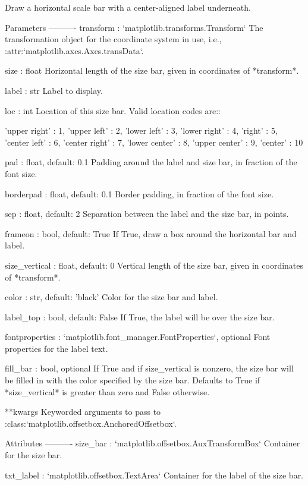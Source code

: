 \begin{DoxyVerb}Draw a horizontal scale bar with a center-aligned label underneath.

Parameters
----------
transform : `matplotlib.transforms.Transform`
    The transformation object for the coordinate system in use, i.e.,
    :attr:`matplotlib.axes.Axes.transData`.

size : float
    Horizontal length of the size bar, given in coordinates of
    *transform*.

label : str
    Label to display.

loc : int
    Location of this size bar. Valid location codes are::

'upper right'  : 1,
'upper left'   : 2,
'lower left'   : 3,
'lower right'  : 4,
'right'        : 5,
'center left'  : 6,
'center right' : 7,
'lower center' : 8,
'upper center' : 9,
'center'       : 10

pad : float, default: 0.1
    Padding around the label and size bar, in fraction of the font
    size.

borderpad : float, default: 0.1
    Border padding, in fraction of the font size.

sep : float, default: 2
    Separation between the label and the size bar, in points.

frameon : bool, default: True
    If True, draw a box around the horizontal bar and label.

size_vertical : float, default: 0
    Vertical length of the size bar, given in coordinates of
    *transform*.

color : str, default: 'black'
    Color for the size bar and label.

label_top : bool, default: False
    If True, the label will be over the size bar.

fontproperties : `matplotlib.font_manager.FontProperties`, optional
    Font properties for the label text.

fill_bar : bool, optional
    If True and if size_vertical is nonzero, the size bar will
    be filled in with the color specified by the size bar.
    Defaults to True if *size_vertical* is greater than
    zero and False otherwise.

**kwargs
    Keyworded arguments to pass to
    :class:`matplotlib.offsetbox.AnchoredOffsetbox`.

Attributes
----------
size_bar : `matplotlib.offsetbox.AuxTransformBox`
    Container for the size bar.

txt_label : `matplotlib.offsetbox.TextArea`
    Container for the label of the size bar.


\end{DoxyVerb}
